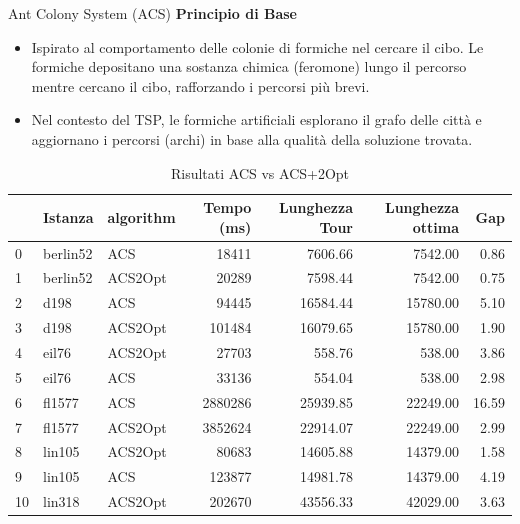 \documentclass{beamer}
\begin{document}
\begin{frame}{Ant Colony System (ACS)}
    \textbf{Principio di Base}
    \begin{itemize}
        \item Ispirato al comportamento delle colonie di formiche nel cercare il cibo. Le formiche depositano una sostanza chimica (feromone) lungo il percorso mentre cercano il cibo, rafforzando i percorsi più brevi.
        \item Nel contesto del TSP, le formiche artificiali esplorano il grafo delle città e aggiornano i percorsi (archi) in base alla qualità della soluzione trovata.
    \end{itemize}

    \begin{table}[H]
        \centering
        \caption{Risultati ACS vs ACS+2Opt}
        \begin{tabular}{lllrrrr}
            \toprule
               & Istanza  & algorithm & Tempo (ms) & Lunghezza Tour & Lunghezza ottima & Gap   \\
            \midrule
            0  & berlin52 & ACS       & 18411      & 7606.66        & 7542.00          & 0.86  \\
            1  & berlin52 & ACS2Opt   & 20289      & 7598.44        & 7542.00          & 0.75  \\
            2  & d198     & ACS       & 94445      & 16584.44       & 15780.00         & 5.10  \\
            3  & d198     & ACS2Opt   & 101484     & 16079.65       & 15780.00         & 1.90  \\
            4  & eil76    & ACS2Opt   & 27703      & 558.76         & 538.00           & 3.86  \\
            5  & eil76    & ACS       & 33136      & 554.04         & 538.00           & 2.98  \\
            6  & fl1577   & ACS       & 2880286    & 25939.85       & 22249.00         & 16.59 \\
            7  & fl1577   & ACS2Opt   & 3852624    & 22914.07       & 22249.00         & 2.99  \\
            8  & lin105   & ACS2Opt   & 80683      & 14605.88       & 14379.00         & 1.58  \\
            9  & lin105   & ACS       & 123877     & 14981.78       & 14379.00         & 4.19  \\
            10 & lin318   & ACS2Opt   & 202670     & 43556.33       & 42029.00         & 3.63  \\

\end{tabular}
\end{table}
\end{frame}
\end{document}
